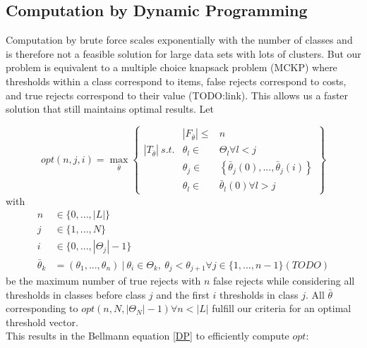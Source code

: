 \subsection{Computation by Dynamic Programming}
\label{dp}
Computation by brute force scales exponentially with the number of classes and is therefore not a feasible solution for large data sets with lots of clusters. But our problem is equivalent to a multiple choice knapsack problem (MCKP) where thresholds within a class correspond to items, false rejects correspond to costs, and true rejects correspond to their value (TODO:link). This allows us a faster solution that still maintains optimal results.
Let

$$
opt(n,j,i) = \max_{\bar{\theta}}
\begin{Bmatrix}
	 & \left|F_{\bar{\theta}}\right| \leq  & n \\
  	\left|T_{\bar{\theta}}\right| \ s.t. & \theta_l \in & \Theta_l \forall l < j \\
  	 & \theta_j \in & \left\{\bar{\theta}_j(0),...,\bar{\theta}_j(i)\right\} \\
  	 & \theta_l \in & \bar{\theta}_l(0) \forall l > j
\end{Bmatrix}
$$
with 
\begin{align}
	n &\in \{0,...,|L|\} \\
	j &\in \{1,...,N\} \\
	i &\in \{0,...,\left|\Theta_j\right|-1\} \\
	\bar{\theta}_k &= (\theta_1,...,\theta_n) \ | \ \theta_i \in \Theta_k, \ \theta_j < \theta_{j+1} \forall j \in \{1,...,n-1\} (TODO)
\end{align}
be the maximum number of true rejects with $n$ false rejects while considering all thresholds in classes before class $j$ and the first $i$ thresholds in class $j$. All $\bar{\theta}$ corresponding to $opt(n,N,\left|\Theta_N\right|-1) \forall n<\left|L\right|$ fulfill our criteria for an optimal threshold vector. \\
This results in the Bellmann equation \ref{DP} to efficiently compute $opt$:

